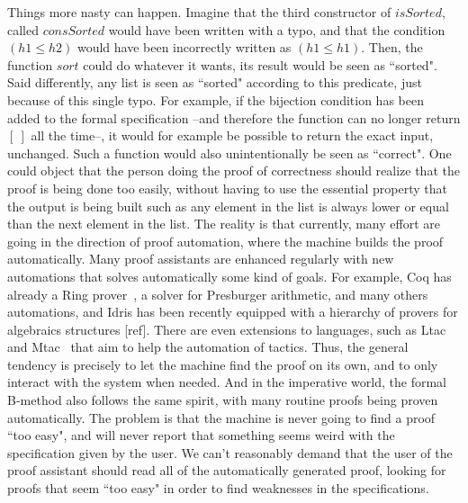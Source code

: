 Things more nasty can happen. Imagine that the third constructor of $isSorted$, called $consSorted$ would have been written with a typo, and that the condition $(h1 \leq h2) $ would have been incorrectly written as $(h1 \leq h1)$. Then, the function $sort$ could do whatever it wants, its result would be seen as ``sorted". Said differently, any list is seen as ``sorted" according to this predicate, just because of this single typo. For example, if the bijection condition has been added to the formal specification --and therefore the function can no longer return $[\ ]$ all the time--, it would for example be possible to return the exact input, unchanged. Such a function would also unintentionally be seen as ``correct". One could object that the person doing the proof of correctness should realize that the proof is being done too easily, without having to use the essential property that the output is being built such as any element in the list is always lower or equal than the next element in the list. The reality is that currently, many effort are going in the direction of proof automation, where the machine builds the proof automatically. Many proof assistants are enhanced regularly with new automations that solves automatically some kind of goals. For example, Coq has already a Ring prover~\cite{coq2005}, a solver for Presburger arithmetic, and many others automations, and Idris has been recently equipped with a hierarchy of provers for algebraics structures [ref]. There are even extensions to languages, such as Ltac~\cite{DelahayeLTac} and Mtac~\cite{Ziliani13} that aim to help the automation of tactics.  Thus, the general tendency is precisely to let the machine find the proof on its own, and to only interact with the system when needed. And in the imperative world, the formal B-method also follows the same spirit, with many routine proofs being proven automatically. The problem is that the machine is never going to find a proof ``too easy", and will never report that something seems weird with the specification given by the user. We can't reasonably demand that the user of the proof assistant should read all of the automatically generated proof, looking for proofs that seem ``too easy" in order to find weaknesses in the specifications.

